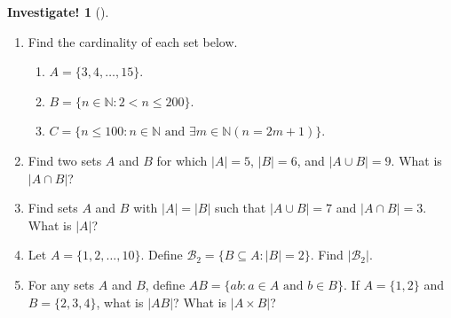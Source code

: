 \documentclass[12pt,]{book}
\theoremstyle{plain}
\theoremstyle{definition}
\theoremstyle{definition}
\theoremstyle{definition}
\newtheorem{investigation}[project]{Investigate!}
\numberwithin{equation}{chapter}
\newcommand{\N}{\mathbb N}
\newcommand{\st}{:}
\newcommand{\lt}{<}
\begin{document}
\begin{investigation}[]\label{investigation-9}
\hypertarget{p-554}{}%
%
\begin{enumerate}
\item\hypertarget{li-227}{}\hypertarget{p-555}{}%
Find the cardinality of each set below. %
\begin{enumerate}
\item\hypertarget{li-228}{}\(A = \{3,4,\ldots, 15\}\).%
\item\hypertarget{li-229}{}\(B = \{n \in \N \st 2 \lt  n \le 200\}\).%
\item\hypertarget{li-230}{}\(C = \{n \le 100 \st n \in \N \text{ and } \exists m \in \N (n = 2m+1)\}\).%
\end{enumerate}
%
\item\hypertarget{li-231}{}\hypertarget{p-556}{}%
Find two sets \(A\) and \(B\) for which \(|A| = 5\), \(|B| = 6\), and \(|A\cup B| = 9\). What is \(|A \cap B|\)?%
\item\hypertarget{li-232}{}\hypertarget{p-557}{}%
Find sets \(A\) and \(B\) with \(|A| = |B|\) such that \(|A\cup B| = 7\) and \(|A \cap B| = 3\). What is \(|A|\)?%
\item\hypertarget{li-233}{}\hypertarget{p-558}{}%
Let \(A = \{1,2,\ldots, 10\}\). Define \(\mathcal{B}_2 = \{B \subseteq A \st |B| = 2\}\). Find \(|\mathcal{B}_2|\).%
\item\hypertarget{li-234}{}For any sets \(A\) and \(B\), define \(AB = \{ab \st a\in A \text{ and } b \in B\}\). If \(A = \{1,2\}\) and \(B = \{2,3,4\}\), what is \(|AB|\)? What is \(|A \times B|\)?%
\end{enumerate}
%
\end{investigation}
\typeout{************************************************}
\typeout{************************************************}
\end{document}
